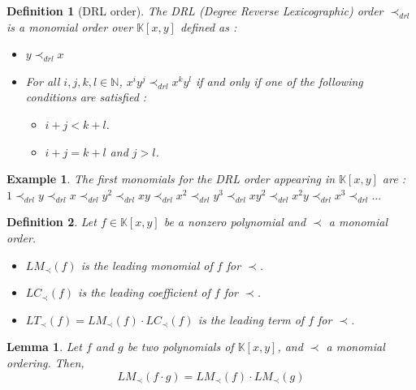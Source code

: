 \documentclass{article}
\newtheorem{lemma}{Lemma}[section]
\newtheorem{definition}{Definition}[section]
\newtheorem{example}{Example}[section]
\begin{document}
\begin{definition}[DRL order]
    The DRL (Degree Reverse Lexicographic) order $\prec_{drl}$ is a monomial order over $\mathbb{K}[x, y]$ defined as : 
    \begin{itemize}
        \item $y \prec_{drl} x$
        \item For all $i, j, k, l \in \mathbb{N}$, $x^{i}y^{j} \prec_{drl} x^{k}y^{l}$ if and only if one of the following conditions are satisfied : 
        \begin{itemize}
            \item $i + j < k + l$.
            \item $i + j = k + l$ and $j > l$.
        \end{itemize}
    \end{itemize}
\end{definition}

\begin{example}
    The first monomials for the DRL order appearing in $\mathbb{K}[x, y]$ are : \\
    $1 \prec_{drl} y \prec_{drl} x \prec_{drl} y^{2} \prec_{drl} xy \prec_{drl} x^{2} \prec_{drl} y^{3} \prec_{drl} xy^{2} \prec_{drl} x^{2} y \prec_{drl} x^{3} \prec_{drl} ...$
\end{example}

\begin{definition} 
    Let $f \in \mathbb{K}[x, y]$ be a nonzero polynomial and $\prec$ a monomial order. 
    \begin{itemize}
        \item $LM_{\prec}(f)$ is the leading monomial of $f$ for $\prec$.
        \item $LC_{\prec}(f)$ is the leading coefficient of $f$ for $\prec$.
        \item $LT_{\prec}(f) = LM_{\prec}(f) \cdot LC_{\prec}(f)$ is the leading term of $f$ for $\prec$.
    \end{itemize}
\end{definition}

\begin{lemma} \label{lemma:lm-mult}
    Let $f$ and $g$ be two polynomials of $\mathbb{K}[x, y]$, and $\prec$ a monomial ordering. Then, 
    \begin{displaymath}
        LM_{\prec}(f \cdot g) = LM_{\prec}(f) \cdot LM_{\prec}(g)
    \end{displaymath}
\end{lemma}
\end{document}
